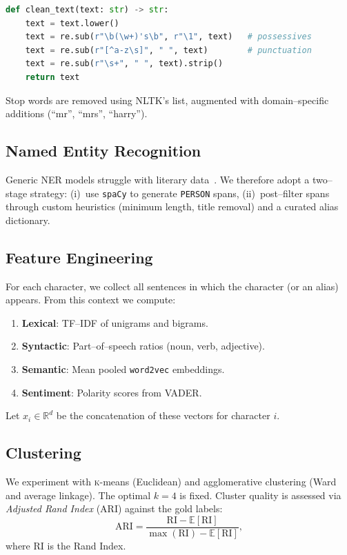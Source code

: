 \documentclass[12pt]{article}
\begin{document}
\begin{lstlisting}[language=Python, caption={Text--cleaning function.}, label={lst:clean}]
def clean_text(text: str) -> str:
    text = text.lower()
    text = re.sub(r"\b(\w+)'s\b", r"\1", text)   # possessives
    text = re.sub(r"[^a-z\s]", " ", text)        # punctuation
    text = re.sub(r"\s+", " ", text).strip()
    return text
\end{lstlisting}

Stop words are removed using NLTK's list, augmented with domain--specific additions (``mr'', ``mrs'', ``harry''). 

\subsection{Named Entity Recognition}
Generic NER models struggle with literary data~\cite{stabler2019named}. 
We therefore adopt a two--stage strategy: (i)~use \texttt{spaCy} to generate \texttt{PERSON} spans, (ii)~post--filter spans through custom heuristics (minimum length, title removal) and a curated alias dictionary.

\subsection{Feature Engineering}
For each character, we collect all sentences in which the character (or an alias) appears. 
From this context we compute:

\begin{enumerate}
\item \textbf{Lexical}: TF--IDF of unigrams and bigrams.
\item \textbf{Syntactic}: Part--of--speech ratios (noun, verb, adjective).
\item \textbf{Semantic}: Mean pooled \texttt{word2vec} embeddings.
\item \textbf{Sentiment}: Polarity scores from VADER.
\end{enumerate}

Let $x_i \in \mathbb{R}^d$ be the concatenation of these vectors for character $i$.

\subsection{Clustering}
We experiment with \textsc{k}-means (Euclidean) and agglomerative clustering (Ward and average linkage). 
The optimal $k=4$ is fixed. 
Cluster quality is assessed via \emph{Adjusted Rand Index} (ARI) against the gold labels:
\[
\text{ARI} = \frac{\text{RI} - \mathbb{E}[\text{RI}]}{\max(\text{RI}) - \mathbb{E}[\text{RI}]},
\]
where RI is the Rand Index.
\end{document}
